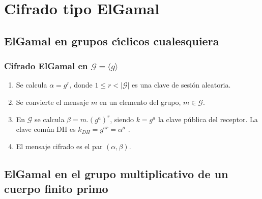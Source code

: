 \documentclass{beamer}
\theoremstyle{plain}        			%
\theoremstyle{definition}   			%
\theoremstyle{saltolinea}   			%
\begin{document}
\section{Cifrado tipo ElGamal}

\subsection{ElGamal en grupos c\'{\i}clicos cualesquiera}

\begin{frame}
\frametitle{Cifrado ElGamal en $\mathcal{G}=\langle g\rangle$}
	\pause
{}
	\pause
\begin{enumerate}[<+-| alert@+>]
	\item Se calcula $\alpha=g^r$, donde $1\le r<|\mathcal{G}|$ es una clave de sesi\'on aleatoria.
	\item Se convierte el mensaje $m$ en un elemento del grupo, $m\in\mathcal{G}$.
	\item En $\mathcal{G}$ se calcula $\beta=m.(g^a)^r$, siendo $k=g^a$ la clave p\'ublica del receptor. La clave com\'un DH es $k_{DH}=g^{ar}=\alpha^a$ .
	\item El mensaje cifrado es el par $(\alpha,\beta)$. 
\end{enumerate}

\end{frame}


\subsection{ElGamal en el grupo multiplicativo de un cuerpo finito primo}
\end{document}
